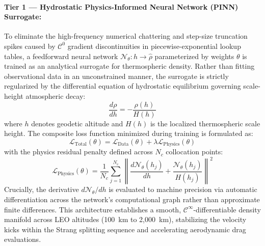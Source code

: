\paragraph{Tier 1 --- Hydrostatic Physics-Informed Neural Network (PINN) Surrogate:}
To eliminate the high-frequency numerical chattering and step-size truncation spikes caused by $\mathcal{C}^0$ gradient discontinuities in piecewise-exponential lookup tables, a feedforward neural network $\mathcal{N}_\theta: h \to \hat{\rho}$ parameterized by weights $\theta$ is trained as an analytical surrogate for thermospheric density. Rather than fitting observational data in an unconstrained manner, the surrogate is strictly regularized by the differential equation of hydrostatic equilibrium governing scale-height atmospheric decay:
\begin{equation}
\frac{d\rho}{dh} = -\frac{\rho(h)}{H(h)}
\label{eq:hydrostatic_ode}
\end{equation}
where $h$ denotes geodetic altitude and $H(h)$ is the localized thermospheric scale height. The composite loss function minimized during training is formulated as:
\begin{equation}
\mathcal{L}_{\text{Total}}(\theta) = \mathcal{L}_{\text{Data}}(\theta) + \lambda \mathcal{L}_{\text{Physics}}(\theta)
\label{eq:pinn_total_loss}
\end{equation}
with the physics residual penalty defined across $N_c$ collocation points:
\begin{equation}
\mathcal{L}_{\text{Physics}}(\theta) = \frac{1}{N_c} \sum_{j=1}^{N_c} \left\| \frac{d\mathcal{N}_\theta(h_j)}{dh} + \frac{\mathcal{N}_\theta(h_j)}{H(h_j)} \right\|^2
\label{eq:pinn_physics_residual}
\end{equation}
Crucially, the derivative $d\mathcal{N}_\theta / dh$ is evaluated to machine precision via automatic differentiation across the network's computational graph rather than approximate finite differences. This architecture establishes a smooth, $\mathcal{C}^\infty$-differentiable density manifold across LEO altitudes (100~km to 2,000~km), stabilizing the velocity kicks within the Strang splitting sequence and accelerating aerodynamic drag evaluations.

